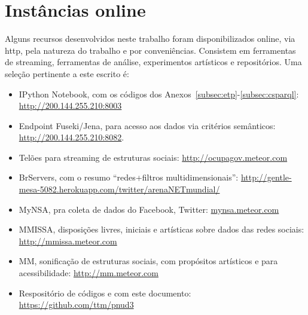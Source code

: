 \documentclass[12pt]{article}
\begin{document}
%


\label{subsec:etp}

\label{subsec:srl}

\label{subsec:intAm}
\label{subsec:rkRd}

\label{subsec:setCon}
\label{subsec:com}
\label{subsec:misto}

\label{subsec:csparql}

\section{Instâncias online}\label{subsec:online}
Alguns recursos desenvolvidos neste trabalho foram disponibilizados online, via http, pela natureza do trabalho e por conveniências. Consistem em ferramentas de streaming, ferramentas de análise, experimentos artísticos e repositórios. Uma seleção pertinente a este escrito é:
\begin{itemize}
    \item IPython Notebook, com os códigos dos Anexos~\ref{subsec:etp}-\ref{subsec:csparql}: \url{http://200.144.255.210:8003}
    \item Endpoint Fuseki/Jena, para acesso aos dados via critérios semânticos: \url{http://200.144.255.210:8082}.
    \item Telões para streaming de estruturas sociais: \url{http://ocupagov.meteor.com}
    \item BrServers, com o resumo ``redes+filtros multidimensionais'': \url{http://gentle-mesa-5082.herokuapp.com/twitter/arenaNETmundial/}
    \item MyNSA, pra coleta de dados do Facebook, Twitter: \url{mynsa.meteor.com}
    \item MMISSA, disposições livres, iniciais e artísticas sobre dados das redes sociais: \url{http://mmissa.meteor.com}
    \item MM, sonificação de estruturas sociais, com propósitos artísticos e para acessibilidade: \url{http://mm.meteor.com}
    \item Respositório de códigos e com este documento: \url{https://github.com/ttm/pnud3}
\end{itemize}
\end{document}
